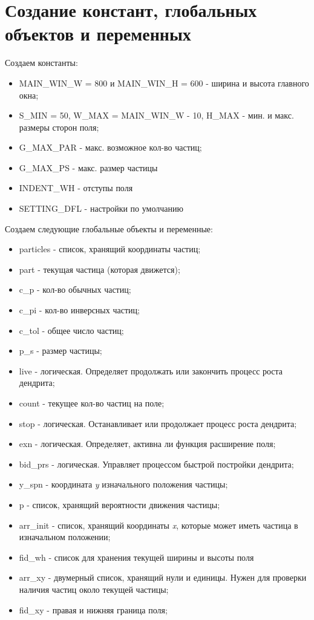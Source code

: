 \section{Создание констант, глобальных объектов и переменных}
Создаем константы:
\begin{itemize}
    \item MAIN\_WIN\_W = 800 и MAIN\_WIN\_H = 600 - ширина и высота главного окна;
    \item S\_MIN = 50, W\_MAX = MAIN\_WIN\_W - 10, H\_MAX - мин. и макс. размеры сторон поля;
    \item G\_MAX\_PAR - макс. возможное кол-во частиц;
    \item G\_MAX\_PS - макс. размер частицы
    \item INDENT\_WH - отступы поля
    \item SETTING\_DFL - настройки по умолчанию
\end{itemize}
Создаем следующие глобальные объекты и переменные:
\begin{itemize}
    \item particles - список, хранящий координаты частиц;
    \item part - текущая частица (которая движется);
    \item c\_p - кол-во обычных частиц;
    \item c\_pi - кол-во инверсных частиц;
    \item c\_tol - общее число частиц;
    \item p\_s - размер частицы;
    \item live - логическая. Определяет продолжать или закончить процесс роста дендрита;
    \item count - текущее кол-во частиц на поле;
    \item stop - логическая. Останавливает или продолжает процесс роста дендрита;
    \item exn - логическая. Определяет, активна ли функция расширение поля;
    \item bid\_prs - логическая. Управляет процессом быстрой постройки дендрита;
    \item y\_spn - координата \textit{y} изначального положения частицы;
    \item p - список, хранящий вероятности движения частицы;
    \item arr\_init - список, хранящий координаты \textit{x}, которые может иметь частица в изначальном положении;
    \item fid\_wh - список для хранения текущей ширины и высоты поля
    \item arr\_xy - двумерный список, хранящий нули и единицы. Нужен для проверки наличия частиц около текущей частицы;
    \item fid\_xy - правая и нижняя граница поля;
\end{itemize}

